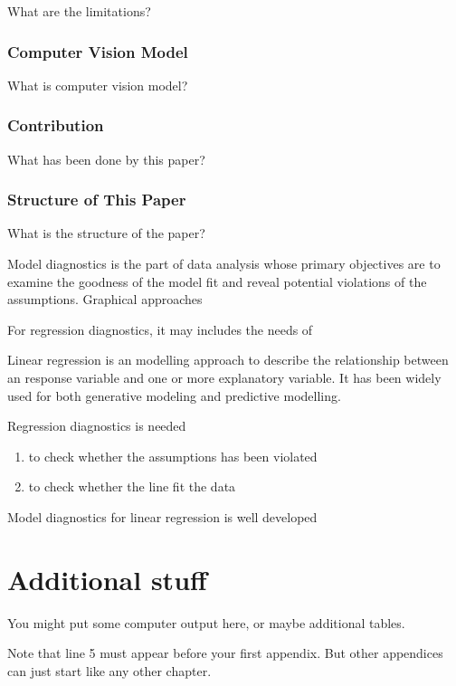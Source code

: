 \documentclass{monashthesis}
\begin{document}
What are the limitations?

\hypertarget{computer-vision-model}{%
\subsection{Computer Vision Model}\label{computer-vision-model}}

What is computer vision model?

\hypertarget{contribution}{%
\subsection{Contribution}\label{contribution}}

What has been done by this paper?

\hypertarget{structure-of-this-paper}{%
\subsection{Structure of This Paper}\label{structure-of-this-paper}}

What is the structure of the paper?

Model diagnostics is the part of data analysis whose primary objectives are to examine the goodness of the model fit and reveal potential violations of the assumptions. Graphical approaches

For regression diagnostics, it may includes the needs of

Linear regression is an modelling approach to describe the relationship between an response variable and one or more explanatory variable. It has been widely used for both generative modeling and predictive modelling.

Regression diagnostics is needed

\begin{enumerate}
\def\labelenumi{\arabic{enumi}.}
\tightlist
\item
  to check whether the assumptions has been violated
\item
  to check whether the line fit the data
\end{enumerate}

Model diagnostics for linear regression is well developed

\appendix

\hypertarget{additional-stuff}{%
\chapter{Additional stuff}\label{additional-stuff}}

You might put some computer output here, or maybe additional tables.

Note that line 5 must appear before your first appendix. But other appendices can just start like any other chapter.

\printbibliography[heading=bibintoc]
\end{document}
